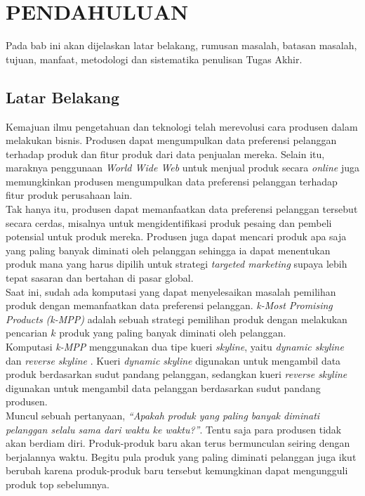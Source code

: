 \chapter{PENDAHULUAN}
\tab Pada bab ini akan dijelaskan latar belakang, rumusan masalah, batasan masalah, tujuan, manfaat, metodologi dan sistematika penulisan Tugas Akhir.

\section{Latar Belakang}
\tab Kemajuan ilmu pengetahuan dan teknologi telah merevolusi cara produsen
dalam melakukan bisnis. Produsen dapat mengumpulkan data preferensi pelanggan
terhadap produk dan fitur produk dari data penjualan mereka. Selain itu, maraknya penggunaan \textit{World Wide Web} untuk menjual produk secara \textit{online} juga memungkinkan produsen mengumpulkan data preferensi pelanggan terhadap fitur produk perusahaan lain.\\
\tab Tak hanya itu, produsen dapat memanfaatkan data preferensi pelanggan tersebut secara cerdas, misalnya untuk mengidentifikasi produk pesaing dan pembeli potensial untuk produk mereka. Produsen juga dapat mencari produk apa saja yang paling banyak diminati oleh pelanggan sehingga ia dapat menentukan produk mana yang harus dipilih untuk strategi \textit{targeted marketing} supaya lebih tepat sasaran dan bertahan di pasar global.\\
\tab Saat ini, sudah ada komputasi yang dapat menyelesaikan masalah pemilihan
produk dengan memanfaatkan data preferensi pelanggan. \textit{k-Most Promising Products (k-MPP)} \cite{kmpp} adalah sebuah strategi pemilihan produk dengan melakukan pencarian $k$ produk yang paling banyak diminati oleh pelanggan.\\
\tab Komputasi \textit{k-MPP} menggunakan dua tipe kueri \textit{skyline}, yaitu \textit{dynamic skyline} \cite{dynamic-skyline} dan \textit{reverse skyline} \cite{reverse-skyline}. Kueri \textit{dynamic skyline} digunakan untuk mengambil data produk berdasarkan sudut pandang pelanggan, sedangkan kueri \textit{reverse skyline} digunakan untuk mengambil data pelanggan berdasarkan sudut pandang produsen.\\
\tab Muncul sebuah pertanyaan, \textit{“Apakah produk yang paling banyak
diminati pelanggan selalu sama dari waktu ke waktu?”}. Tentu saja para produsen tidak akan berdiam diri. Produk-produk baru akan terus bermunculan seiring dengan berjalannya waktu. Begitu pula produk yang paling diminati pelanggan juga ikut berubah karena produk-produk baru tersebut kemungkinan dapat mengungguli produk top sebelumnya.\\
